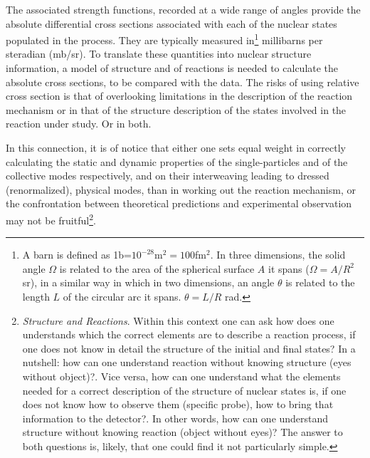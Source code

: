 The associated strength functions, recorded at a wide range of angles provide the absolute differential cross sections associated with each of the nuclear states populated in the process. They are  typically measured in\footnote{A barn is defined as 1b=$10^{-28}$m$^2=100$fm$^2$. In three dimensions, the solid angle $\Omega$ is related to the area of the spherical surface $A$ it spans ($\Omega=A/R^2$ sr), in a similar way in which in two dimensions, an angle $\theta$ is related to the length $L$ of the circular arc it spans. $\theta=L/R$ rad.} millibarns per  steradian (mb/sr). To translate these quantities into nuclear structure information, a model of structure and of reactions is needed to calculate the absolute cross sections, to be compared with the data. The risks of using relative cross section is that of overlooking limitations in the description of the reaction mechanism or in that of the structure description of the states involved in the reaction under study. Or in both.

In this connection, it is of notice that either one sets equal weight in correctly calculating the static and dynamic   properties  of the single-particles and of the collective modes respectively, and on their interweaving leading to dressed (renormalized), physical modes, than in working out the reaction mechanism, or the confrontation between theoretical predictions and experimental observation may not be fruitful\footnote{\textit{Structure and Reactions}. Within this context one can ask how does one understands which the correct elements are to describe a reaction process, if one does not know in detail the structure of the initial and final states? In a nutshell: how can one understand reaction without knowing structure (eyes without object)?. 
Vice versa, how can one understand what the elements needed for a correct description of the structure of nuclear states is, if one does not know how to observe them (specific probe), how to bring that information to the detector?. In other words, how can one understand structure without knowing reaction (object without eyes)? The answer to both questions is, likely, that one could find it not particularly simple.}.

